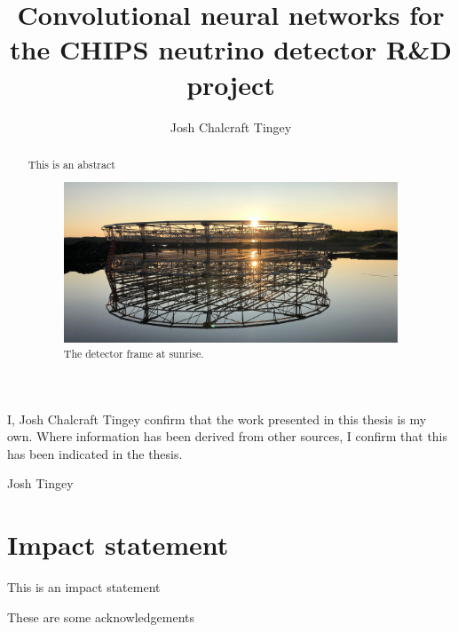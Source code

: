 
\title{Convolutional neural networks for the CHIPS neutrino detector R\&D project}
\author{Josh Chalcraft Tingey}

\thispagestyle{plain}

\begin{declaration} %
    I, Josh Chalcraft Tingey confirm that the work presented in this thesis is my own. Where
    information has been derived from other sources, I confirm that this has been indicated in the
    thesis.
    \vspace*{1cm}
    \begin{flushright}
        Josh Tingey
    \end{flushright}
\end{declaration}

\begin{abstract} %
    This is an abstract

    \begin{figure} %
        \includegraphics[width=\textwidth]{diagrams/4-chips/sunrise_short.jpeg}
        \caption*{The \chipsfive detector frame at sunrise.}
    \end{figure}

\end{abstract}

\chapter*{\centering Impact statement}
This is an impact statement

\begin{acknowledgements} %
    These are some acknowledgements
\end{acknowledgements}

\tableofcontents %
\listoffigures %
\listoftables %